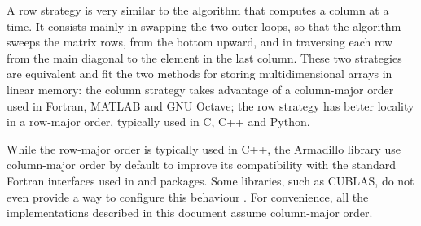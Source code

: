\documentclass[../thesis]{subfiles}
\begin{document}
	A row strategy is very similar to the algorithm that computes a column at a time. It consists mainly in swapping the two outer loops, so that the algorithm sweeps the matrix rows, from the bottom upward, and in traversing each row from the main diagonal to the element in the last column. These two strategies are equivalent and fit the two methods for storing multidimensional arrays in linear memory: the column strategy takes advantage of a column-major order used in Fortran, MATLAB and GNU Octave; the row strategy has better locality in a row-major order, typically used in C, C++ and Python.

	While the row-major order is typically used in C++, the Armadillo library use column-major order by default to improve its compatibility with the standard Fortran interfaces used in \blas and \lapack packages. Some libraries, such as CUBLAS, do not even provide a way to configure this behaviour \cite{NVIDIA:CUBLAS:5:0}. For convenience, all the implementations described in this document assume column-major order.
\end{document}
